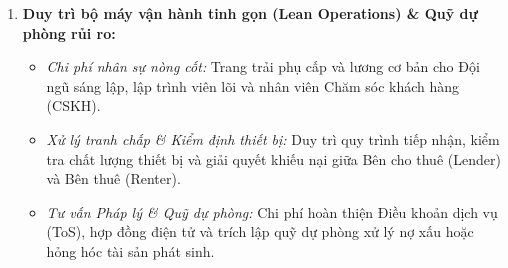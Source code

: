 \begin{enumerate}
    \item \textbf{Duy trì bộ máy vận hành tinh gọn (Lean Operations) \& Quỹ dự phòng rủi ro:}
    \begin{itemize}
        \item \textit{Chi phí nhân sự nòng cốt:} Trang trải phụ cấp và lương cơ bản cho Đội ngũ sáng lập, lập trình viên lõi và nhân viên Chăm sóc khách hàng (CSKH).
        \item \textit{Xử lý tranh chấp \& Kiểm định thiết bị:} Duy trì quy trình tiếp nhận, kiểm tra chất lượng thiết bị và giải quyết khiếu nại giữa Bên cho thuê (Lender) và Bên thuê (Renter).
        \item \textit{Tư vấn Pháp lý \& Quỹ dự phòng:} Chi phí hoàn thiện Điều khoản dịch vụ (ToS), hợp đồng điện tử và trích lập quỹ dự phòng xử lý nợ xấu hoặc hỏng hóc tài sản phát sinh.
    \end{itemize}
\end{enumerate}
